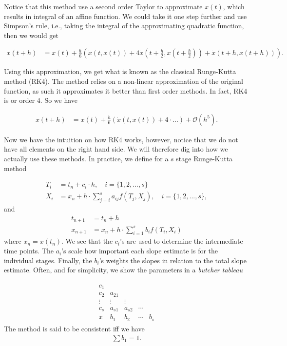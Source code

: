 Notice that this method use a second order Taylor to approximate $x(t)$, which results in integral of an affine function. We could take it one step further and use Simpson's rule, i.e., taking the integral of the approximating quadratic function, then we would get

\begin{align}
    x(t+h) &= x(t) + \frac{h}{6} \left( \dot{x}\left (t, x\left (t\right) \right) + 4 \dot{x}\left (t+ \frac{h}{2}, x\left (t+\frac{h}{2}\right) \right) +\dot{x}\left (t+h, x\left (t+h\right) \right) \right).
\end{align}

Using this approximation, we get what is known as the classical Runge-Kutta method (RK4). The method relies on a non-linear approximation of the original function, as such it approximates it better than first order methods. In fact, RK4 is or order 4\cite{Ascher}. So we have

\begin{align}
    x(t+h) &= x(t) + \frac{h}{6} \left( \dot{x}\left (t, x\left (t\right) \right) + 4 \cdot ...  \right) + \mathcal{O}(h^5).
\end{align}

Now we have the intuition on how RK4 works, however, notice that we do not have all elements on the right hand side. We will therefore dig into how we actually use these methods. In practice, we define for a $s$ stage Runge-Kutta method 

\begin{align}
    T_i &= t_n+c_i \cdot h, \quad i = \{1,2,...,s\}\\
    X_i &= x_n + h \cdot \sum_{j=i}^{s} a_{ij} f(T_j, X_j), \quad i = \{1,2,...,s\},
\end{align}
and
\begin{align}
    t_{n+1} &= t_n + h \\
    x_{n+1} &= x_n + h \cdot \sum_{i=1}^s b_i f(T_i,X_i)
\end{align}
where $x_n=x(t_n)$. We see that the $c_i$'s are used to determine the intermediate time points. The $a_i$'s scale how important each slope estimate is for the individual stages. Finally, the $b_i$'s weights the slopes in relation to the total slope estimate. Often, and for simplicity, we show the parameters in a \textit{butcher tableau}

\begin{align}
    \begin{array}{c|cccc}
         c_1 & & & &   \\
         c_2 & a_{21} & & & \\
         \vdots & \vdots  & \vdots & & \\
         c_s & a_{s1} & a_{s2} & \cdots & \\ \hline 
         x & b_1 & b_2 & \cdots & b_s
    \end{array}
\end{align}
The method is said to be consistent iff we have
\begin{align}
    \sum b_1 = 1.
\end{align}

